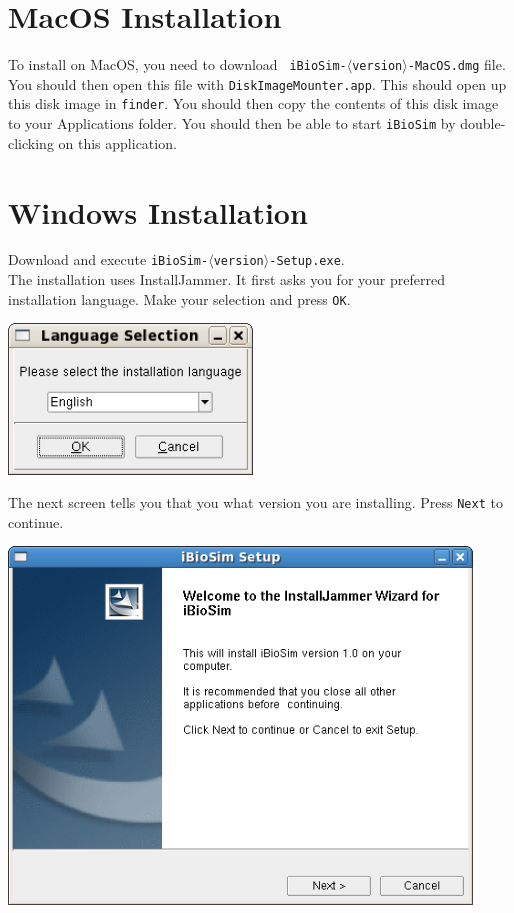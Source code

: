 \documentclass[titlepage,11pt]{article}
\begin{document}
\section{MacOS Installation}

\noindent
To install on MacOS, you need to download {\tt
  iBioSim-$\langle$version$\rangle$-MacOS.dmg} file.  You should then
open this file with {\tt DiskImageMounter.app}.  This should open up
this disk image in {\tt finder}.  You should then copy the contents of
this disk image to your Applications folder.  You should then be able
to start {\tt iBioSim} by double-clicking on this application. 

\section{Windows Installation}

\noindent
Download and execute {\tt iBioSim-$\langle$version$\rangle$-Setup.exe}.\\
The installation uses InstallJammer.  It first asks you for your
preferred installation language.  Make your selection and press {\tt OK}.

\includegraphics[height=40mm]{screenshots/language}

The next screen tells you that you what version you are installing.
Press {\tt Next} to continue.

\includegraphics[height=95mm]{screenshots/setup}
\end{document}
